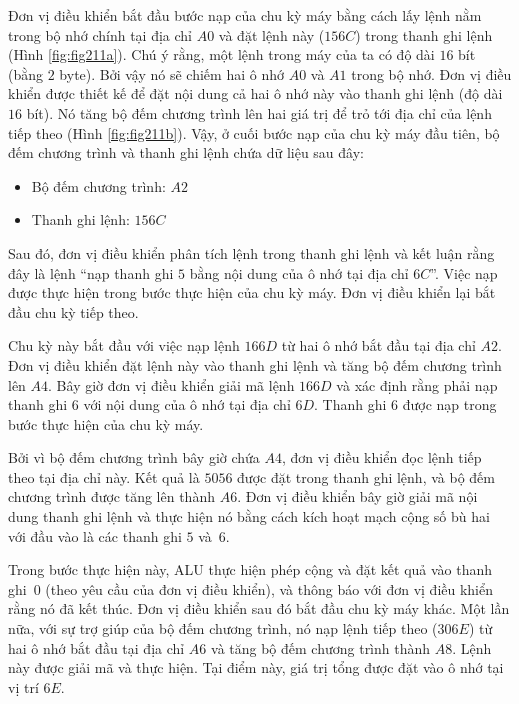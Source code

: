 Đơn vị điều khiển bắt đầu bước nạp của chu kỳ máy bằng cách lấy lệnh nằm trong bộ nhớ
chính tại địa chỉ $A0$ và đặt lệnh này ($156C$) trong thanh ghi lệnh (Hình
\ref{fig:fig211a}). Chú ý rằng, một lệnh trong máy của ta có độ dài $16$ bít (bằng $2$
byte). Bởi vậy nó sẽ chiếm hai ô nhớ $A0$ và $A1$ trong bộ nhớ. Đơn vị điều khiển được
thiết kế để đặt nội dung cả hai ô nhớ này vào thanh ghi lệnh (độ dài $16$ bít).  Nó tăng
bộ đếm chương trình lên hai giá trị để trỏ tới địa chỉ của lệnh tiếp theo (Hình
\ref{fig:fig211b}). Vậy, ở cuối bước nạp của chu kỳ máy đầu tiên, bộ đếm chương trình và
thanh ghi lệnh chứa dữ liệu sau đây:

\begin{itemize}
\item[] Bộ đếm chương trình: $A2$

\item[] Thanh ghi lệnh: $156C$
\end{itemize}

Sau đó, đơn vị điều khiển phân tích lệnh trong thanh ghi lệnh và kết luận rằng đây là lệnh
``nạp thanh ghi $5$ bằng nội dung của ô nhớ tại địa chỉ $6C$''.  Việc nạp được thực hiện
trong bước thực hiện của chu kỳ máy. Đơn vị điều khiển lại bắt đầu chu kỳ tiếp theo.

Chu kỳ này bắt đầu với việc nạp lệnh $166D$ từ hai ô nhớ bắt đầu tại địa chỉ $A2$. Đơn vị
điều khiển đặt lệnh này vào thanh ghi lệnh và tăng bộ đếm chương trình lên $A4$. Bây giờ
đơn vị điều khiển giải mã lệnh $166D$ và xác định rằng phải nạp thanh ghi $6$ với nội dung
của ô nhớ tại địa chỉ $6D$. Thanh ghi $6$ được nạp trong bước thực hiện của chu kỳ máy.

Bởi vì bộ đếm chương trình bây giờ chứa $A4$, đơn vị điều khiển đọc lệnh tiếp theo tại địa
chỉ này. Kết quả là $5056$ được đặt trong thanh ghi lệnh, và bộ đếm chương trình được tăng
lên thành $A6$. Đơn vị điều khiển bây giờ giải mã nội dung thanh ghi lệnh và thực hiện nó
bằng cách kích hoạt mạch cộng số bù hai với đầu vào là các thanh ghi $5$ và~$6$.

Trong bước thực hiện này, ALU thực hiện phép cộng và đặt kết quả vào thanh ghi~$0$ (theo
yêu cầu của đơn vị điều khiển), và thông báo với đơn vị điều khiển rằng nó đã kết
thúc. Đơn vị điều khiển sau đó bắt đầu chu kỳ máy khác. Một lần nữa, với sự trợ giúp của
bộ đếm chương trình, nó nạp lệnh tiếp theo ($306E$) từ hai ô nhớ bắt đầu tại địa chỉ $A6$
và tăng bộ đếm chương trình thành $A8$. Lệnh này được giải mã và thực hiện. Tại điểm này,
giá trị tổng được đặt vào ô nhớ tại vị trí $6E$.

